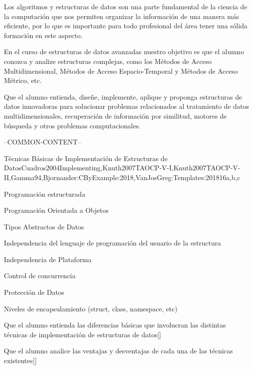 \begin{syllabus}


\begin{justification}
Los algoritmos y estructuras de datos son una parte fundamental de la ciencia de la computación que nos 
permiten organizar la información de una manera más eficiente, por lo que es importante para todo 
profesional del área tener una sólida formación en este aspecto.

En el curso de estructuras de datos avanzadas nuestro objetivo es que el alumno conozca y analize 
estructuras complejas, como los Métodos de Acceso Multidimensional, 
Métodos de Acceso Espacio-Temporal y Métodos de Acceso Métrico, etc.
\end{justification}

\begin{goals}
\item Que el alumno entienda, diseñe, implemente, aplique y
proponga estructuras de datos innovadoras para solucionar
problemas relacionados al tratamiento de datos multidimensionales,
recuperación de información por similitud, motores de búsqueda y
otros problemas computacionales.
\end{goals}

--COMMON-CONTENT--

\begin{unit}{Técnicas Básicas de Implementación de Estructuras de Datos}{}{Cuadros2004Implementing,Knuth2007TAOCP-V-I,Knuth2007TAOCP-V-II,Gamma94,Bjornander:CByExample:2018,VanJosGreg:Templates:2018}{16}{a,b,c}
   \begin{topics}
         \item Programación estructurada
         \item Programación Orientada a Objetos
         \item Tipos Abstractos de Datos
         \item Independencia del lenguaje de programación del usuario de la estructura
         \item Independencia de Plataforma
         \item Control de concurrencia
         \item Protección de Datos
         \item Niveles de encapsulamiento (struct, class, namespace, etc)
   \end{topics}
   \begin{learningoutcomes}
         \item Que el alumno entienda las diferencias básicas que involucran las distintas técnicas de implementación de estructuras de datos[\Usage]
         \item Que el alumno analice las ventajas y desventajas de cada una de las técnicas existentes[\Usage]
   \end{learningoutcomes}
\end{unit}


\end{syllabus}
